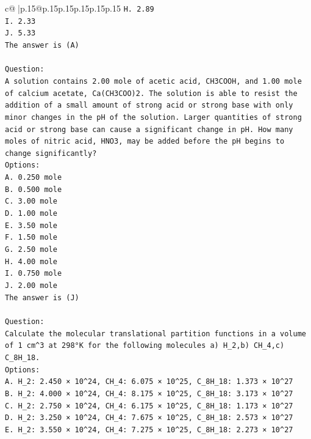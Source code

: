 \documentclass{article}
\begin{document}
{\begin{supertabular}{c@{$\;$}|p{.15\linewidth}@{}p{.15\linewidth}p{.15\linewidth}p{.15\linewidth}p{.15\linewidth}p{.15\linewidth}}
{{{\texttt{H. 2.89} \\
\texttt{I. 2.33} \\
\texttt{J. 5.33} \\
\texttt{The answer is (A)} \\
\\ 
\texttt{Question:} \\
\texttt{A solution contains 2.00 mole of acetic acid, CH3COOH, and 1.00 mole of calcium acetate, Ca(CH3COO)2. The solution is able to resist the addition of a small amount of strong acid or strong base with only minor changes in the pH of the solution. Larger quantities of strong acid or strong base can cause a significant change in pH. How many moles of nitric acid, HNO3, may be added before the pH begins to change significantly?} \\
\texttt{Options:} \\
\texttt{A. 0.250 mole} \\
\texttt{B. 0.500 mole} \\
\texttt{C. 3.00 mole} \\
\texttt{D. 1.00 mole} \\
\texttt{E. 3.50 mole} \\
\texttt{F. 1.50 mole} \\
\texttt{G. 2.50 mole} \\
\texttt{H. 4.00 mole} \\
\texttt{I. 0.750 mole} \\
\texttt{J. 2.00 mole} \\
\texttt{The answer is (J)} \\
\\ 
\texttt{Question:} \\
\texttt{Calculate the molecular translational partition functions in a volume of 1 cm\^{}3 at 298°K for the following molecules a) H\_2,b) CH\_4,c) C\_8H\_18.} \\
\texttt{Options:} \\
\texttt{A. H\_2: 2.450 × 10\^{}24, CH\_4: 6.075 × 10\^{}25, C\_8H\_18: 1.373 × 10\^{}27} \\
\texttt{B. H\_2: 4.000 × 10\^{}24, CH\_4: 8.175 × 10\^{}25, C\_8H\_18: 3.173 × 10\^{}27} \\
\texttt{C. H\_2: 2.750 × 10\^{}24, CH\_4: 6.175 × 10\^{}25, C\_8H\_18: 1.173 × 10\^{}27} \\
\texttt{D. H\_2: 3.250 × 10\^{}24, CH\_4: 7.675 × 10\^{}25, C\_8H\_18: 2.573 × 10\^{}27} \\
\texttt{E. H\_2: 3.550 × 10\^{}24, CH\_4: 7.275 × 10\^{}25, C\_8H\_18: 2.273 × 10\^{}27} \\
}}}
\end{supertabular}}
\end{document}
